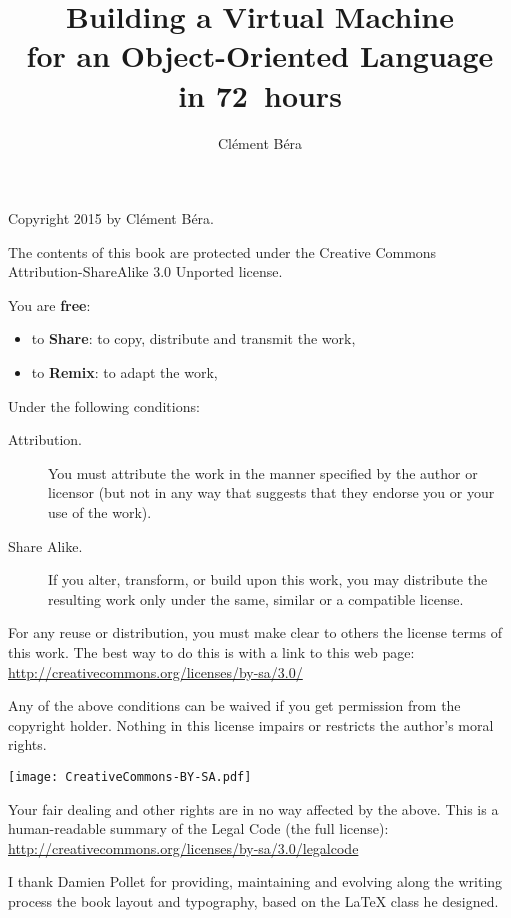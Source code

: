 \documentclass[10pt,twoside,english,showtrims]{support/latex/sbabook/sbabook}
\title{Building a Virtual Machine \protect\\
  for an Object-Oriented Language \protect\\
  in 72~hours}
\author{Clément Béra}
\date{\gitdate\titlebreak[\smallskip]{ -- }\protect\gitCommitInfo}
\begin{document}
\maketitle
\pagestyle{titlingpage}
\thispagestyle{titlingpage} %

\cleartoverso
{\small

  Copyright 2015 by Clément Béra.

  The contents of this book are protected under the Creative Commons
  Attribution-ShareAlike 3.0 Unported license.

  You are \textbf{free}:
  \begin{itemize}
  \item to \textbf{Share}: to copy, distribute and transmit the work,
  \item to \textbf{Remix}: to adapt the work,
  \end{itemize}

  Under the following conditions:
  \begin{description}
  \item[Attribution.] You must attribute the work in the manner specified by the
    author or licensor (but not in any way that suggests that they endorse you
    or your use of the work).
  \item[Share Alike.] If you alter, transform, or build upon this work, you may
    distribute the resulting work only under the same, similar or a compatible
    license.
  \end{description}

  For any reuse or distribution, you must make clear to others the
  license terms of this work. The best way to do this is with a link to
  this web page: \\
  \url{http://creativecommons.org/licenses/by-sa/3.0/}

  Any of the above conditions can be waived if you get permission from
  the copyright holder. Nothing in this license impairs or restricts the
  author's moral rights.

 \begin{center}
   \texttt{[image: CreativeCommons-BY-SA.pdf]}
 \end{center}

  Your fair dealing and other rights are in no way affected by the
  above. This is a human-readable summary of the Legal Code (the full
  license): \\
  \url{http://creativecommons.org/licenses/by-sa/3.0/legalcode}

  I thank Damien Pollet for providing, maintaining and evolving along the writing process the book layout and typography, based on the  \LaTeX{} class he designed.
}
\end{document}
